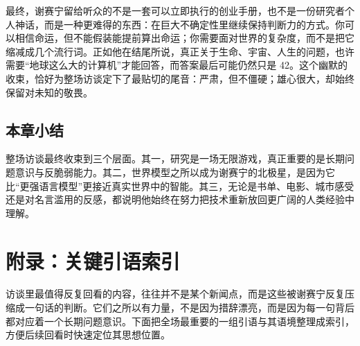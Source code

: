 \documentclass[a4paper,12pt]{article}
\begin{document}
最终，谢赛宁留给听众的不是一套可以立即执行的创业手册，也不是一份研究者个人神话，而是一种更难得的东西：在巨大不确定性里继续保持判断力的方式。你可以相信命运，但不能假装能提前算出命运；你需要面对世界的复杂度，而不是把它缩减成几个流行词。正如他在结尾所说，真正关于生命、宇宙、人生的问题，也许需要“地球这么大的计算机”才能回答，而答案最后可能仍然只是 42。这个幽默的收束，恰好为整场访谈定下了最贴切的尾音：严肃，但不僵硬；雄心很大，却始终保留对未知的敬畏。

\subsection{本章小结}

整场访谈最终收束到三个层面。其一，研究是一场无限游戏，真正重要的是长期问题意识与反脆弱能力。其二，世界模型之所以成为谢赛宁的北极星，是因为它比“更强语言模型”更接近真实世界中的智能。其三，无论是书单、电影、城市感受还是对名言滥用的反感，都说明他始终在努力把技术重新放回更广阔的人类经验中理解。

\section*{附录：关键引语索引}

访谈里最值得反复回看的内容，往往并不是某个新闻点，而是这些被谢赛宁反复压缩成一句话的判断。它们之所以有力量，不是因为措辞漂亮，而是因为每一句背后都对应着一个长期问题意识。下面把全场最重要的一组引语与其语境整理成索引，方便后续回看时快速定位其思想位置。
\end{document}
